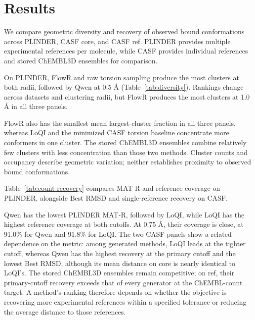 \providecommand{\manuscriptroot}{}
\section{Results}
\label{sec:results}



We compare geometric diversity and recovery of observed bound conformations across
PLINDER, CASF core, and CASF ref. PLINDER provides multiple experimental references per
molecule, while CASF provides individual references and stored ChEMBL3D ensembles for comparison.

On PLINDER, FlowR and raw torsion sampling produce the most clusters at both radii,
followed by Qwen at 0.5 \AA{} (Table~\ref{tab:diversity}). Rankings change across
datasets and clustering radii, but FlowR produces the most clusters at 1.0 \AA{}
in all three panels.



FlowR also has the smallest mean largest-cluster fraction in all three panels,
whereas LoQI and the minimized CASF torsion baseline concentrate more conformers in one cluster.
The stored ChEMBL3D ensembles combine relatively few clusters with less concentration
than those two methods. Cluster counts and occupancy describe geometric variation;
neither establishes proximity to observed bound conformations.

Table~\ref{tab:count-recovery} compares MAT-R and reference coverage on PLINDER,
alongside Best RMSD and single-reference recovery on CASF.



Qwen has the lowest PLINDER MAT-R, followed by LoQI, while LoQI has the highest
reference coverage at both cutoffs. At 0.75 \AA{}, their coverage is close,
at 91.0\% for Qwen and 91.8\% for LoQI. The two CASF
panels show a related dependence on the metric: among generated methods, LoQI leads at the
tighter cutoff, whereas Qwen has the highest recovery at the primary cutoff and the lowest
Best RMSD, although its mean distance on core is nearly identical to LoQI's. The stored
ChEMBL3D ensembles remain competitive; on ref, their primary-cutoff
recovery exceeds that of every generator at the ChEMBL-count target. A method's ranking
therefore depends on whether the objective is recovering more experimental references
within a specified tolerance or reducing the average distance to those references.

